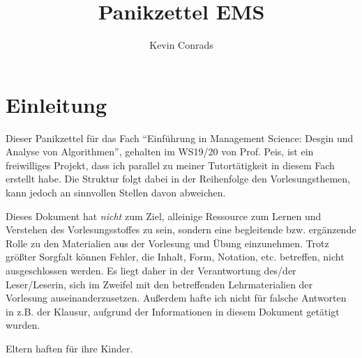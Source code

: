 \documentclass{panikzettel}
\title{Panikzettel EMS}
\author{Kevin Conrads}
\begin{document}
\maketitle

\tableofcontents

\section{Einleitung}
Dieser Panikzettel für das Fach ``Einführung in Management Science: Desgin und Analyse von Algorithmen'', gehalten im WS19/20 von Prof. Peis, ist ein freiwilliges Projekt, dass ich parallel zu meiner Tutortätigkeit in diesem Fach erstellt habe. Die Struktur folgt dabei in der Reihenfolge den Vorlesungsthemen, kann jedoch an sinnvollen Stellen davon abweichen.

Dieses Dokument hat \emph{nicht} zum Ziel, alleinige Ressource zum Lernen und Verstehen des Vorlesungsstoffes zu sein, sondern eine begleitende bzw. ergänzende Rolle zu den Materialien aus der Vorlesung und Übung einzunehmen. Trotz größter Sorgfalt können Fehler, die Inhalt, Form, Notation, etc. betreffen, nicht ausgeschlossen werden. Es liegt daher in der Verantwortung des/der Leser/Leserin, sich im Zweifel mit den betreffenden Lehrmaterialien der Vorlesung auseinanderzusetzen. Außerdem hafte ich nicht für falsche Antworten in z.B. der Klausur, aufgrund der Informationen in diesem Dokument getätigt wurden. 

Eltern haften für ihre Kinder.
\end{document}
